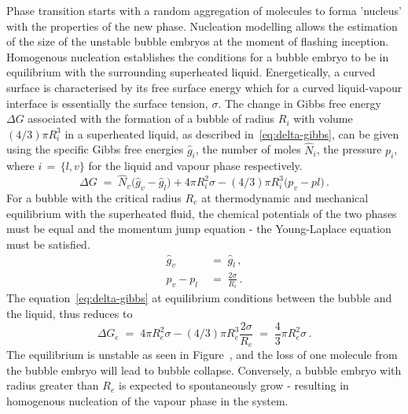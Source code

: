 Phase transition starts with a random 
 aggregation of molecules to forma 'nucleus' with the properties of the new phase. 
 Nucleation modelling allows the estimation of the size of the unstable bubble embryos 
 at the moment of flashing inception. Homogenous nucleation establishes the conditions for a bubble embryo to be in equilibrium with 
 the surrounding superheated liquid. Energetically, a
 curved surface is characterised by its free surface energy which for a curved liquid-vapour
 interface is essentially the surface tension, $\sigma$. 
 The change in Gibbs free energy $\Delta G$ associated with the formation of a bubble of radius
 $R_{i}$ with volume $(4/3) \pi R_{i}^{3}$ in a superheated liquid, as described in~\eqref{eq:delta-gibbs},
 can be given using the specific Gibbs free energies $\hat{g}_{i}$, 
 the number of moles $\hat{N}_{i}$, the pressure $p_{i}$, where $i\,=\,\{l,v\}$
 for the liquid and vapour phase respectively.
 \begin{equation}\label{eq:delta-gibbs}
  \Delta G \;=\; \hat{N}_{v}\bigl(\hat{g}_{v} - \hat{g}_{l}\bigr) 
  + 4\pi R_{i}^{2} \sigma 
  - (4/3) \pi R_{i}^{3}\bigl(p_{v} - p{l}\bigr)\,.
 \end{equation}
 For a bubble with the critical radius $R_{e}$ at thermodynamic and mechanical equilibrium 
 with the superheated fluid, the chemical potentials of the two phases must be equal
 and the momentum jump equation - the Young-Laplace equation must be satisfied.
 \begin{subequations}
  \begin{align}
    \hat{g}_{v} &\;=\; \hat{g}_{l}\,,\\
    p_{v} - p_{l} &\;=\; \frac{2\sigma}{R_{i}}\,.
  \end{align}
 \end{subequations}
 The equation~\eqref{eq:delta-gibbs} at equilibrium conditions between the bubble and the liquid, 
 thus reduces to 
 \begin{equation}
  \Delta G_{e} \;=\; 4\pi R_{e}^{2} \sigma - (4/3) \pi R_{e}^{3}\frac{2\sigma}{R_{e}}\;=\; \frac{4}{3} \pi R_{e}^{2} \sigma\,.
 \end{equation}
 The equilibrium is unstable as seen in Figure~, and the loss of one molecule from
 the bubble embryo will lead to bubble collapse. Conversely, a bubble embryo with radius greater than
 $R_{e}$ is expected to spontaneously grow - resulting in homogenous nucleation of the vapour phase in the system.
 







